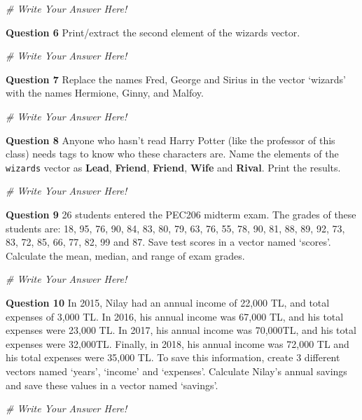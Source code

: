 \documentclass[
]{article}
\newenvironment{Shaded}{\begin{snugshade}}{\end{snugshade}}
\newcommand{\CommentTok}[1]{\textcolor[rgb]{0.56,0.35,0.01}{\textit{#1}}}
\begin{document}
\begin{Shaded}
\begin{Highlighting}[]
\CommentTok{\# Write Your Answer Here!}
\end{Highlighting}
\end{Shaded}

\textbf{Question 6} Print/extract the second element of the wizards
vector.

\begin{Shaded}
\begin{Highlighting}[]
\CommentTok{\# Write Your Answer Here!}
\end{Highlighting}
\end{Shaded}

\textbf{Question 7} Replace the names Fred, George and Sirius in the
vector `wizards' with the names Hermione, Ginny, and Malfoy.

\begin{Shaded}
\begin{Highlighting}[]
\CommentTok{\# Write Your Answer Here!}
\end{Highlighting}
\end{Shaded}

\textbf{Question 8} Anyone who hasn't read Harry Potter (like the
professor of this class) needs tags to know who these characters are.
Name the elements of the \texttt{wizards} vector as \textbf{Lead},
\textbf{Friend}, \textbf{Friend}, \textbf{Wife} and \textbf{Rival}.
Print the results.

\begin{Shaded}
\begin{Highlighting}[]
\CommentTok{\# Write Your Answer Here!}
\end{Highlighting}
\end{Shaded}

\textbf{Question 9} 26 students entered the PEC206 midterm exam. The
grades of these students are: 18, 95, 76, 90, 84, 83, 80, 79, 63, 76,
55, 78, 90, 81, 88, 89, 92, 73, 83, 72, 85, 66, 77, 82, 99 and 87. Save
test scores in a vector named `scores'. Calculate the mean, median, and
range of exam grades.

\begin{Shaded}
\begin{Highlighting}[]
\CommentTok{\# Write Your Answer Here!}
\end{Highlighting}
\end{Shaded}

\textbf{Question 10} In 2015, Nilay had an annual income of 22,000 TL,
and total expenses of 3,000 TL. In 2016, his annual income was 67,000
TL, and his total expenses were 23,000 TL. In 2017, his annual income
was 70,000TL, and his total expenses were 32,000TL. Finally, in 2018,
his annual income was 72,000 TL and his total expenses were 35,000 TL.
To save this information, create 3 different vectors named `years',
`income' and `expenses'. Calculate Nilay's annual savings and save these
values in a vector named `savings'.

\begin{Shaded}
\begin{Highlighting}[]
\CommentTok{\# Write Your Answer Here!}
\end{Highlighting}
\end{Shaded}
\end{document}

